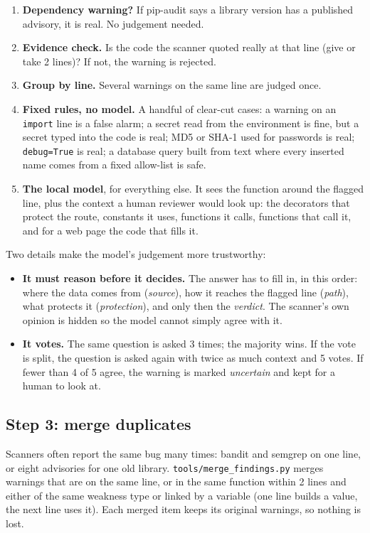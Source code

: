 \documentclass[11pt,a4paper]{article}
\newcommand{\code}[1]{\texttt{#1}}
\begin{document}
\begin{enumerate}
  \item \textbf{Dependency warning?} If pip-audit says a library version has a published advisory, it is real.
        No judgement needed.
  \item \textbf{Evidence check.} Is the code the scanner quoted really at that line (give or take 2 lines)?
        If not, the warning is rejected.
  \item \textbf{Group by line.} Several warnings on the same line are judged once.
  \item \textbf{Fixed rules, no model.} A handful of clear-cut cases: a warning on an \code{import} line is a
        false alarm; a secret read from the environment is fine, but a secret typed into the code is real;
        MD5 or SHA-1 used for passwords is real; \code{debug=True} is real; a database query built from text
        where every inserted name comes from a fixed allow-list is safe.
  \item \textbf{The local model}, for everything else. It sees the function around the flagged line, plus
        the context a human reviewer would look up: the decorators that protect the route, constants it uses,
        functions it calls, functions that call it, and for a web page the code that fills it.
\end{enumerate}

Two details make the model's judgement more trustworthy:

\begin{itemize}
  \item \textbf{It must reason before it decides.} The answer has to fill in, in this order: where the data
        comes from (\emph{source}), how it reaches the flagged line (\emph{path}), what protects it
        (\emph{protection}), and only then the \emph{verdict}. The scanner's own opinion is hidden so the model
        cannot simply agree with it.
  \item \textbf{It votes.} The same question is asked 3 times; the majority wins. If the vote is split, the
        question is asked again with twice as much context and 5 votes. If fewer than 4 of 5 agree, the warning
        is marked \emph{uncertain} and kept for a human to look at.
\end{itemize}


\subsection{Step 3: merge duplicates}
Scanners often report the same bug many times: bandit and semgrep on one line, or eight advisories for one
old library. \code{tools/merge\_findings.py} merges warnings that are on the same line, or in the same
function within 2 lines and either of the same weakness type or linked by a variable (one line builds a
value, the next line uses it). Each merged item keeps its original warnings, so nothing is lost.
\end{document}
